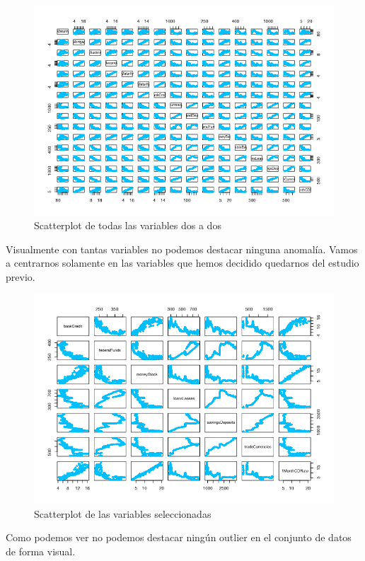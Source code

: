 \documentclass[12pt,a4paper]{article}
\begin{document}
\begin{figure}[H]
	\centering
	\includegraphics[scale=0.95]{./Imagenes/pairplot_todas.png}
	\caption{Scatterplot de todas las variables dos a dos}
\end{figure}

Visualmente con tantas variables no podemos destacar ninguna anomalía. Vamos a centrarnos solamente en las variables que hemos decidido quedarnos del estudio previo.

\begin{figure}[H]
	\centering
	\includegraphics[scale=0.95]{./Imagenes/pairplot_variables_seleccionadas.png}
	\caption{Scatterplot de las variables seleccionadas}
\end{figure}

Como podemos ver no podemos destacar ningún outlier en el conjunto de datos de forma visual.
\end{document}
